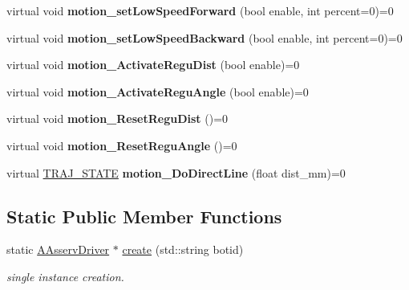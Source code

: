 \begin{DoxyCompactItemize}
\mbox{\label{classAAsservDriver_a6912c759115a6357b3ce8ce55f365663}} 
virtual void {\bfseries motion\+\_\+set\+Low\+Speed\+Forward} (bool enable, int percent=0)=0
\item 
\mbox{\label{classAAsservDriver_a621a0b60fec76be04f8960f2e56ba5fe}} 
virtual void {\bfseries motion\+\_\+set\+Low\+Speed\+Backward} (bool enable, int percent=0)=0
\item 
\mbox{\label{classAAsservDriver_a7a41963b5f908604a55f109e7ea3214e}} 
virtual void {\bfseries motion\+\_\+\+Activate\+Regu\+Dist} (bool enable)=0
\item 
\mbox{\label{classAAsservDriver_ae5b16fb3a46e690deb213b556749e33f}} 
virtual void {\bfseries motion\+\_\+\+Activate\+Regu\+Angle} (bool enable)=0
\item 
\mbox{\label{classAAsservDriver_a658d7dad992e6eb5066a396a8fbaf645}} 
virtual void {\bfseries motion\+\_\+\+Reset\+Regu\+Dist} ()=0
\item 
\mbox{\label{classAAsservDriver_a0426d6401a8fa5ff8489f9b040a616da}} 
virtual void {\bfseries motion\+\_\+\+Reset\+Regu\+Angle} ()=0
\item 
\mbox{\label{classAAsservDriver_a24fc4fe4bd8dae4d0658b5102f343657}} 
virtual \hyperlink{path__manager_8h_adb3360abeb29758da93865c8afcb80eb}{T\+R\+A\+J\+\_\+\+S\+T\+A\+TE} {\bfseries motion\+\_\+\+Do\+Direct\+Line} (float dist\+\_\+mm)=0
\end{DoxyCompactItemize}
\subsection*{Static Public Member Functions}
\begin{DoxyCompactItemize}
\item 
\mbox{\label{classAAsservDriver_aa8b144fdccac014af94b93f743d89fa8}} 
static \hyperlink{classAAsservDriver}{A\+Asserv\+Driver} $\ast$ \hyperlink{classAAsservDriver_aa8b144fdccac014af94b93f743d89fa8}{create} (std\+::string botid)
\begin{DoxyCompactList}\small\item\em single instance creation. \end{DoxyCompactList}\end{DoxyCompactItemize}

